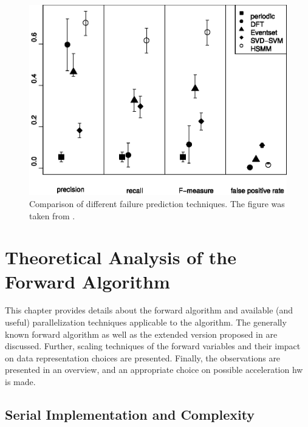 \documentclass[mscthesis]{usiinfthesis}
\begin{document}
\begin{figure}
    \includegraphics[width=1\columnwidth]{./schema/results_salfner.eps}
    \caption{Comparison of different failure prediction techniques. The figure
        was taken from \cite{salfner08}.}
    \label{fig:results_salfner}
\end{figure}

\chapter{Theoretical Analysis of the Forward Algorithm}
\label{ch:analysis}
\glsresetall %

This chapter provides details about the forward algorithm and available (and
useful) parallelization techniques applicable to the algorithm. The generally
known forward algorithm as well as the extended version proposed in
\cite{salfner08} are discussed. Further, scaling techniques of the forward
variables and their impact on data representation choices are presented.
Finally, the observations are presented in an overview, and an appropriate
choice on possible acceleration \gls{hw} is made.

\section{Serial Implementation and Complexity}
\label{ch:analysis_serial}
\end{document}
